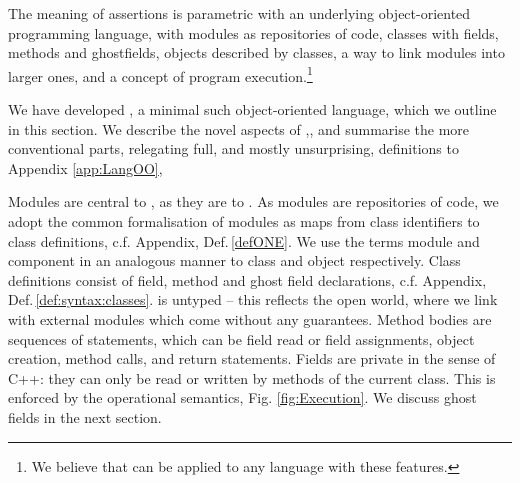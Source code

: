 \renewcommand{\appref}[1]{, c.f. Appendix, Def.\,\ref{#1}}
 
The meaning of \Chainmail assertions is parametric with an
underlying object-oriented programming language, with modules  as repositories of code, classes with fields, methods and
ghostfields, objects described by classes, a way to link  modules into larger ones, and a concept of 
program execution.\footnote{We believe that \Chainmail can be applied to 
any language with these features.}

We have developed   \LangOO, a minimal such object-oriented language, which we
outline in  this section. 
We  describe the novel aspects of \LangOO,, and 
summarise the more conventional parts, relegating  full, and mostly unsurprising,
definitions %
to Appendix \ref{app:LangOO},  
 

Modules are central to \LangOO, as they are to \Chainmail. As modules are repositories
of code, we adopt the common formalisation of modules as maps from 
class identifiers to class definitions\appref{defONE}. We use the terms module and component in an
analogous manner to class and object respectively. Class
definitions consist of field, method and ghost field declarations\appref{def:syntax:classes}.  \LangOO is untyped -- this reflects the
open world, where we link with external modules which come without any
guarantees.
Method bodies are sequences of 
statements, which  can be field read or field assignments, object
creation, method calls, and return statements. 
Fields are private in the sense of C++: they can only be read or
written by methods of the current class.
This is enforced by the operational semantics, \cf Fig.  \ref{fig:Execution}.
We  discuss ghost fields in the next section.

